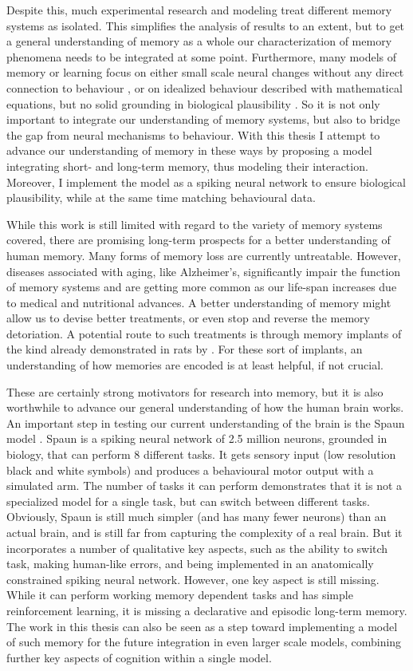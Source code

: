 Despite this, much experimental research and modeling treat different memory systems as isolated.
This simplifies the analysis of results to an extent, but to get a general understanding of memory as a whole our characterization of memory phenomena needs to be integrated at some point.
Furthermore, many models of memory or learning focus on either small scale neural changes without any direct connection to behaviour \parencite[e.g.,][]{Levy2005}, or on idealized behaviour
described with mathematical equations, but no solid grounding in biological plausibility \parencite[e.g.][]{Milford2004}.
So it is not only important to integrate our understanding of memory systems, but also to bridge the gap from neural mechanisms to behaviour.
With this thesis I attempt to advance our understanding of memory in these ways by proposing a model integrating short- and long-term memory, thus modeling their interaction.
Moreover, I implement the model as a spiking neural network to ensure biological plausibility, while at the same time matching behavioural data.

While this work is still limited with regard to the variety of memory systems covered, there are promising long-term prospects for a better understanding of human memory.
Many forms of memory loss are currently untreatable.
However, diseases associated with aging, like Alzheimer's, significantly impair the function of memory systems and are getting more common as our life-span increases due to medical and nutritional advances.
A better understanding of memory might allow us to devise better treatments, or even stop and reverse the memory detoriation.
A potential route to such treatments is through memory implants of the kind already demonstrated in rats by \textcite{Berger2011}.
For these sort of implants, an understanding of how memories are encoded is at least helpful, if not crucial.

These are certainly strong motivators for research into memory, but it is also worthwhile to advance our general understanding of how the human brain works.
An important step in testing our current understanding of the brain is the Spaun model \parencite{Eliasmith2012}.
Spaun is a spiking neural network of 2.5 million neurons, grounded in biology, that can perform 8 different tasks.
It gets sensory input (low resolution black and white symbols) and produces a behavioural motor output with a simulated arm.
The number of tasks it can perform demonstrates that it is not a specialized model for a single task, but can switch between different tasks.
Obviously, Spaun is still much simpler (and has many fewer neurons) than an actual brain, and is still far from capturing the complexity of a real brain.
But it incorporates a number of qualitative key aspects, such as the ability to switch task, making human-like errors, and being implemented in an anatomically constrained spiking neural network.
However, one key aspect is still missing.
While it can perform working memory dependent tasks and has simple reinforcement learning, it is missing a declarative and episodic long-term memory.
The work in this thesis can also be seen as a step toward implementing a model of such memory for the future integration in even larger scale models, combining further key aspects of cognition within a single model.


